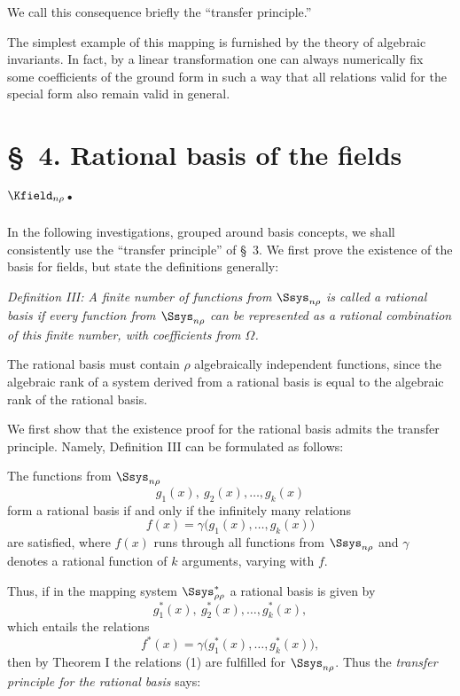 \documentclass[11pt]{article}
\begin{document}
We call this consequence briefly the ``transfer principle.''



\providecommand{\Lsys}{\mathfrak{L}}
\providecommand{\Jdom}{\mathfrak{J}}

\clearpage
The simplest example of this mapping is furnished by the theory of algebraic invariants. In fact, by a linear transformation one can always numerically fix some coefficients of the ground form in such a way that all relations valid for the special form also remain valid in general.

\section*{\S\ 4. Rational basis of the fields $\Kfield_{n\rho}$.}

In the following investigations, grouped around basis concepts, we shall consistently use the ``transfer principle'' of \S\ 3. We first prove the existence of the basis for fields, but state the definitions generally:

\emph{Definition III: A finite number of functions from $\Ssys_{n\rho}$ is called a rational basis if every function from $\Ssys_{n\rho}$ can be represented as a rational combination of this finite number, with coefficients from $\Omega$.}

The rational basis must contain $\rho$ algebraically independent functions, since the algebraic rank of a system derived from a rational basis is equal to the algebraic rank of the rational basis.

We first show that the existence proof for the rational basis admits the transfer principle. Namely, Definition III can be formulated as follows:

The functions from $\Ssys_{n\rho}$
\[
  g_1(x),\ g_2(x),\ldots, g_k(x)
\]
form a rational basis if and only if the infinitely many relations
\begin{equation}
  f(x)=\gamma\bigl(g_1(x),\ldots,g_k(x)\bigr)
\tag{1}
\end{equation}
are satisfied, where $f(x)$ runs through all functions from $\Ssys_{n\rho}$ and $\gamma$ denotes a rational function of $k$ arguments, varying with $f$.

Thus, if in the mapping system $\Ssys^*_{\rho\rho}$ a rational basis is given by
\[
  g_1^*(x),\ g_2^*(x),\ldots,g_k^*(x),
\]
which entails the relations
\[
  f^*(x)=\gamma\bigl(g_1^*(x),\ldots,g_k^*(x)\bigr),
\]
then by Theorem I the relations (1) are fulfilled for $\Ssys_{n\rho}$. Thus the \emph{transfer principle for the rational basis} says:
\end{document}
